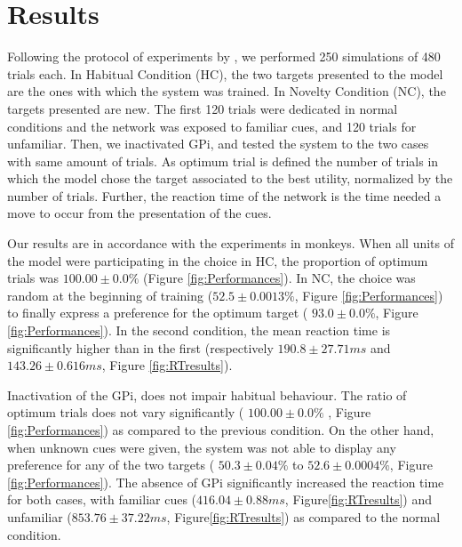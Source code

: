 \section{Results}

Following the protocol of experiments by \citet{Piron2015}, we
performed 250 simulations of 480 trials each. In Habitual Condition 
(HC), the two targets presented to the model are the ones with which 
the system was trained. In Novelty Condition (NC), the targets 
presented are new. The first 120 trials were dedicated in normal 
conditions and the network was exposed to familiar cues, and 120 
trials for unfamiliar. Then, we inactivated GPi, and tested the system to the two cases with same amount of trials. As optimum trial is defined the number of trials in which the model chose the target associated to the best utility, normalized by the number of trials. Further, the reaction time of the network is the time needed a move to occur from the presentation of the cues.
       
Our results are in accordance with the experiments in monkeys.
When all units of the model were participating in the choice 
in HC, the proportion of optimum trials was  
$100.00\pm 0.0\%$ (Figure \ref{fig:Performances}). In NC, 
the choice was random at the beginning of training 
($52.5 \pm 0.0013\%$, Figure \ref{fig:Performances}) to finally 
express a preference for the optimum target ( $93.0 \pm 0.0\%$, 
Figure \ref{fig:Performances}). In the second condition, the mean 
reaction time is significantly higher than in the first (respectively  
$190.8 \pm 27.71ms$ and $143.26 \pm 0.616ms$, Figure
\ref{fig:RTresults}).

Inactivation of the GPi, does not impair habitual behaviour. The 
ratio of optimum trials does not vary significantly ( $100.00\pm 
0.0\%$ , Figure \ref{fig:Performances}) as compared to the 
previous condition. On the other hand, when unknown cues were
given, the system was not able to display any preference for any of 
the two targets ( $50.3 \pm 0.04\%$ to  $52.6\pm 0.0004\%$,
Figure \ref{fig:Performances}). The absence of GPi significantly 
increased the reaction time for both cases, with familiar cues
($416.04 \pm 0.88ms$, Figure\ref{fig:RTresults}) and unfamiliar 
($853.76 \pm 37.22ms$, Figure\ref{fig:RTresults}) as compared to 
the normal condition.
